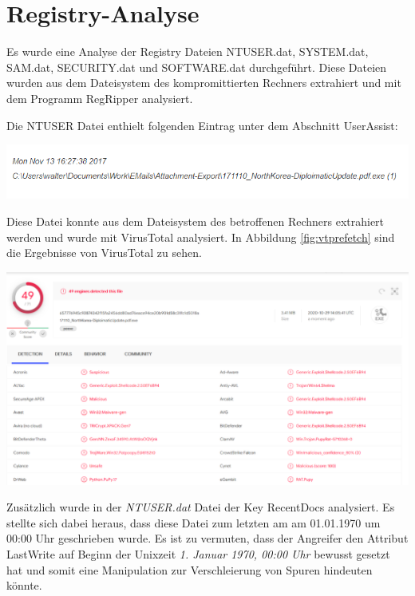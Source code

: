 \section{Registry-Analyse}
Es wurde eine Analyse der Registry Dateien NTUSER.dat, SYSTEM.dat, SAM.dat, SECURITY.dat und SOFTWARE.dat durchgeführt. Diese Dateien wurden aus dem Dateisystem des kompromittierten Rechners extrahiert und mit dem Programm RegRipper analysiert.

Die NTUSER Datei enthielt folgenden Eintrag unter dem Abschnitt UserAssist:
\\
\begin{center}
	\includegraphics[width=15.8cm]{figures/prefetch_path.png}
	\label{fig:prefetch_path}
\end{center}

Diese Datei konnte aus dem Dateisystem des betroffenen Rechners extrahiert werden und wurde mit VirusTotal analysiert. In Abbildung \ref{fig:vtprefetch}  sind die Ergebnisse von VirusTotal zu sehen.

\begin{center}
	\includegraphics[width=15.8cm]{figures/virustotal_prefetch.png}
	\label{fig:vtprefetch}
\end{center}

Zusätzlich wurde in der\textit{ NTUSER.dat} Datei der Key RecentDocs analysiert. Es stellte sich dabei heraus, dass diese Datei zum letzten am am 01.01.1970 um 00:00 Uhr geschrieben wurde. Es ist zu vermuten, dass der Angreifer den Attribut LastWrite auf Beginn der Unixzeit \textit{1. Januar 1970, 00:00 Uhr} bewusst gesetzt hat und somit eine Manipulation zur Verschleierung von Spuren hindeuten könnte.

